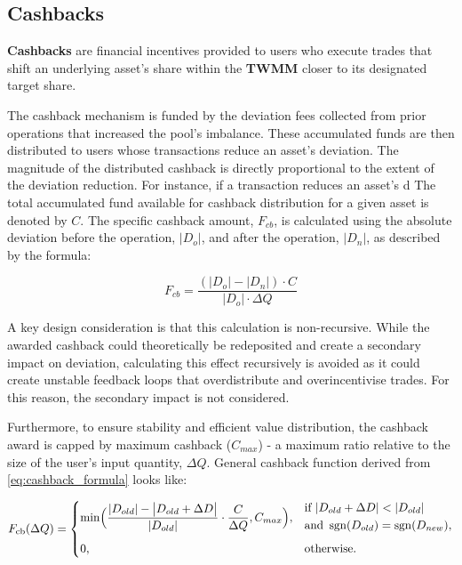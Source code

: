 \subsection{Cashbacks}
\textbf{Cashbacks} are financial incentives provided to users who execute trades that shift an underlying asset's share within the \textbf{TWMM} closer to its designated target share.

The cashback mechanism is funded by the deviation fees collected from prior operations that increased the pool's imbalance. These accumulated funds are then distributed to users whose transactions reduce an asset's deviation. The magnitude of the distributed cashback is directly proportional to the extent of the deviation reduction. For instance, if a transaction reduces an asset's d 
The total accumulated fund available for cashback distribution for a given asset is denoted by $C$. The specific cashback amount, $F_{cb}$, is calculated using the absolute deviation before the operation, $|D_o|$, and after the operation, $|D_n|$, as described by the formula:

\begin{equation}
	\label{eq:cashback_formula}
	F_{cb} = \frac{(|D_o| - |D_n|) \cdot C}{|D_o| \cdot \Delta Q} 
\end{equation}

A key design consideration is that this calculation is non-recursive. While the awarded cashback could theoretically be redeposited and create a secondary impact on deviation, calculating this effect recursively is avoided as it could create unstable feedback loops that overdistribute and overincentivise trades. For this reason, the secondary impact is not considered. 

Furthermore, to ensure stability and efficient value distribution, the cashback award is capped by  maximum cashback ($C_{max}$) - a maximum ratio relative to the size of the user's input quantity, $\Delta Q$. General cashback function derived from \ref{eq:cashback_formula} looks like:

\begin{equation}
	\label{eq:invariant_swap_cashback_function}
	F_{\mathrm{cb}}(\Delta Q)
	=
	\begin{cases}
		\displaystyle
		\begin{aligned}
			\min\Bigl(
			\frac{\lvert D_{old}\rvert
				- \bigl\lvert D_{old}
				+ \Delta D\bigr\rvert}
			{\lvert D_{old}\rvert}
			\cdot \frac{C}{\Delta Q},C_{max}
			\Bigr),
		\end{aligned}
		&
		\begin{aligned}
			&\text{if }\lvert D_{old} + \Delta D\rvert
			< \lvert D_{old}\rvert\\
			& \text{and }\operatorname{sgn}(D_{old})
			= \operatorname{sgn}(D_{new}),
		\end{aligned}
		\\[3ex]
		0,
		& \text{otherwise.}
	\end{cases}
\end{equation}



